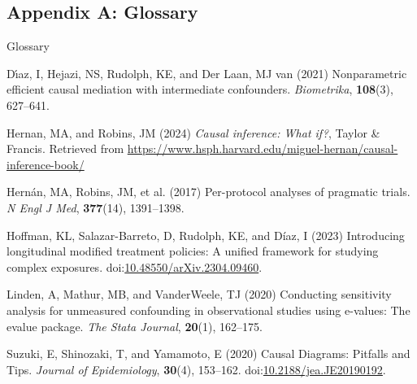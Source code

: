 \documentclass[
  single column]{article}
\newlength{\cslhangindent}
\newenvironment{CSLReferences}[2] %
 {\begin{list}{}{%
  \setlength{\itemindent}{0pt}
  \setlength{\leftmargin}{0pt}
  \setlength{\parsep}{0pt}
  \ifodd #1
   \setlength{\leftmargin}{\cslhangindent}
   \setlength{\itemindent}{-1\cslhangindent}
  \fi
  \setlength{\itemsep}{#2\baselineskip}}}
 {\end{list}}
\begin{document}
\newpage{}

\subsection{Appendix A: Glossary}\label{appendix-a-glossary}

\begin{table}

\caption{\label{tbl-experiments}Glossary}

\centering{

\glossaryTerms

}

\end{table}%

\label{refs}
\begin{CSLReferences}{1}{0}
Dı́az, I, Hejazi, NS, Rudolph, KE, and Der Laan, MJ van (2021)
Nonparametric efficient causal mediation with intermediate confounders.
\emph{Biometrika}, \textbf{108}(3), 627--641.

Hernan, MA, and Robins, JM (2024) \emph{Causal inference: What if?},
Taylor \& Francis. Retrieved from
\url{https://www.hsph.harvard.edu/miguel-hernan/causal-inference-book/}

Hernán, MA, Robins, JM, et al. (2017) Per-protocol analyses of pragmatic
trials. \emph{N Engl J Med}, \textbf{377}(14), 1391--1398.

Hoffman, KL, Salazar-Barreto, D, Rudolph, KE, and Díaz, I (2023)
Introducing longitudinal modified treatment policies: A unified
framework for studying complex exposures.
doi:\href{https://doi.org/10.48550/arXiv.2304.09460}{10.48550/arXiv.2304.09460}.

Linden, A, Mathur, MB, and VanderWeele, TJ (2020) Conducting sensitivity
analysis for unmeasured confounding in observational studies using
e-values: The evalue package. \emph{The Stata Journal}, \textbf{20}(1),
162--175.

Suzuki, E, Shinozaki, T, and Yamamoto, E (2020) Causal Diagrams:
Pitfalls and Tips. \emph{Journal of Epidemiology}, \textbf{30}(4),
153--162.
doi:\href{https://doi.org/10.2188/jea.JE20190192}{10.2188/jea.JE20190192}.

\end{CSLReferences}
\end{document}
